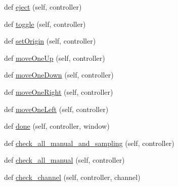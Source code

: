 \begin{DoxyCompactItemize}
def \mbox{\hyperlink{classgui_1_1_manual_page_a0de2157aaaeff0caef49e89b5e1bc469}{eject}} (self, controller)
\item 
def \mbox{\hyperlink{classgui_1_1_manual_page_a033656cfd366b9be59abbbfa977460b6}{toggle}} (self, controller)
\item 
def \mbox{\hyperlink{classgui_1_1_manual_page_a44e1acd86d45652102beaa175029d19c}{set\+Origin}} (self, controller)
\item 
def \mbox{\hyperlink{classgui_1_1_manual_page_a5bbaa7afbf1723a2bb369c1d6bcf9559}{move\+One\+Up}} (self, controller)
\item 
def \mbox{\hyperlink{classgui_1_1_manual_page_ab2fca02c98e8dd45885747eb8df839eb}{move\+One\+Down}} (self, controller)
\item 
def \mbox{\hyperlink{classgui_1_1_manual_page_a13214fd8cfc2545063c04d01cca5a76c}{move\+One\+Right}} (self, controller)
\item 
def \mbox{\hyperlink{classgui_1_1_manual_page_adad45d1e0774a31434814e3c699e9261}{move\+One\+Left}} (self, controller)
\item 
def \mbox{\hyperlink{classgui_1_1_manual_page_ac5c61f69c0761507a9dc9a3c4d43f2f5}{done}} (self, controller, window)
\item 
def \mbox{\hyperlink{classgui_1_1_manual_page_a0aecdea93ced54d8ead080770b2526df}{check\+\_\+all\+\_\+manual\+\_\+and\+\_\+sampling}} (self, controller)
\item 
def \mbox{\hyperlink{classgui_1_1_manual_page_ae70283a008dbdf796e148b4a3ce9c0fc}{check\+\_\+all\+\_\+manual}} (self, controller)
\item 
def \mbox{\hyperlink{classgui_1_1_manual_page_a2b9736f35eed9710bbb1a40be20bc21a}{check\+\_\+channel}} (self, controller, channel)
\end{DoxyCompactItemize}
